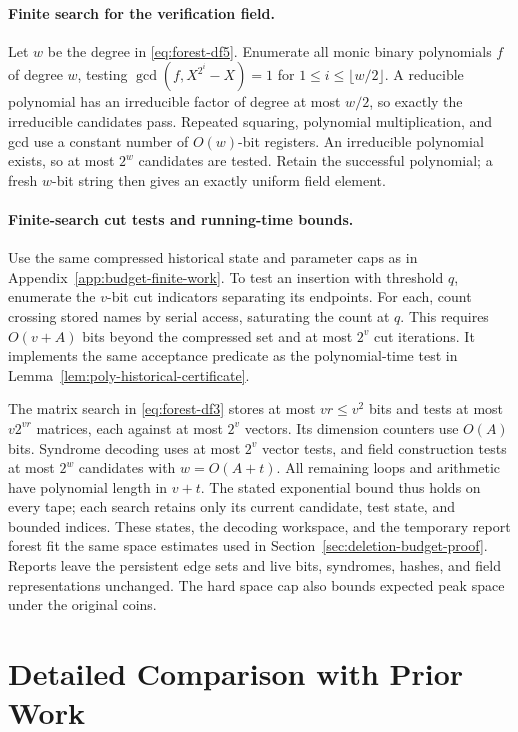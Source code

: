 \documentclass[11pt,letterpaper]{article}
\numberwithin{equation}{section}
\begin{document}
\paragraph{Finite search for the verification field.}
Let $w$ be the degree in \eqref{eq:forest-df5}.
Enumerate all monic binary polynomials $f$ of degree $w$, testing $\gcd(f,X^{2^i}-X)=1$ for $1\le i\le\lfloor w/2\rfloor$.
A reducible polynomial has an irreducible factor of degree at most $w/2$, so exactly the irreducible candidates pass.
Repeated squaring, polynomial multiplication, and gcd use a constant number of $O(w)$-bit registers.
An irreducible polynomial exists, so at most $2^w$ candidates are tested.
Retain the successful polynomial; a fresh $w$-bit string then gives an exactly uniform field element.

\paragraph{Finite-search cut tests and running-time bounds.}
\label{app:budget-finite-search-details}
Use the same compressed historical state and parameter caps as in Appendix~\ref{app:budget-finite-work}.
To test an insertion with threshold $q$, enumerate the $v$-bit cut indicators separating its endpoints.
For each, count crossing stored names by serial access, saturating the count at $q$.
This requires $O(v+A)$ bits beyond the compressed set and at most $2^v$ cut iterations.
It implements the same acceptance predicate as the polynomial-time test in Lemma~\ref{lem:poly-historical-certificate}.

The matrix search in \eqref{eq:forest-df3} stores at most $vr\le v^2$ bits and tests at most $v2^{vr}$ matrices, each against at most $2^v$ vectors.
Its dimension counters use $O(A)$ bits.
Syndrome decoding uses at most $2^v$ vector tests, and field construction tests at most $2^w$ candidates with $w=O(A+t)$.
All remaining loops and arithmetic have polynomial length in $v+t$.
The stated exponential bound thus holds on every tape; each search retains only its current candidate, test state, and bounded indices.
These states, the decoding workspace, and the temporary report forest fit the same space estimates used in Section~\ref{sec:deletion-budget-proof}.
Reports leave the persistent edge sets and live bits, syndromes, hashes, and field representations unchanged.
The hard space cap also bounds expected peak space under the original coins.

\section{Detailed Comparison with Prior Work}
\label{sec:extended-related-work}
\end{document}
